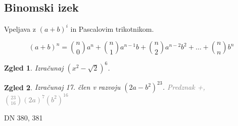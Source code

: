 \documentclass{article}
\newtheorem*{zgled}{Zgled}
\begin{document}
\subsection{Binomski izek}

Vpeljava z $(a+b)^i$ in Pascalovim trikotnikom.


\[\left(a+b\right)^n = \binom{n}{0}a^n +\binom{n}{1}a^{n-1}b + \binom{n}{2}a^{n-2}b^2+\ldots + \binom{n}{n}b^n\]

\begin{zgled}
    Izračunaj $(x^2-\sqrt{2})^6$.
\end{zgled}

\begin{zgled}
    Izračunaj 17. člen v razvoju $(2a-b^2)^23$. \textcolor{gray}{Predznak +, $\binom{23}{16}(2a)^7(b^2)^16$}
\end{zgled}

DN 380, 381
\end{document}
